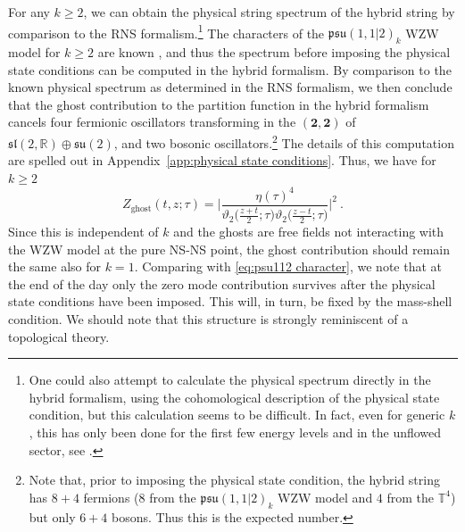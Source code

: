 \documentclass[12pt,a4paper]{article}
\newcommand{\be}{\begin{equation}}
\newcommand{\ee}{\end{equation}}
\begin{document}
For any $k \ge 2$, we can obtain the physical string spectrum of the hybrid string by comparison to the RNS formalism.\footnote{One could also attempt to calculate the physical spectrum directly in the hybrid formalism, using the cohomological description of the physical state condition, but this calculation seems to be difficult. In fact, even for generic $k$, this has only been done for the first few energy levels and in the unflowed sector, see \cite{Gerigk:2012cq}.} The characters of the $\mathfrak{psu}(1,1|2)_k$ WZW model for $k \ge 2$ are known \cite{Gotz:2006qp}, and thus the spectrum before imposing the physical state conditions can be computed in the hybrid formalism. By comparison to the known physical spectrum as determined in the RNS formalism, we then conclude that the ghost contribution to the partition function in the hybrid formalism cancels four fermionic oscillators transforming in the $(\mathbf{2},\mathbf{2})$ of $\mathfrak{sl}(2,\mathds{R}) \oplus \mathfrak{su}(2)$, and two bosonic oscillators.\footnote{Note that, prior to imposing the physical state condition, the hybrid string has $8+4$ fermions ($8$ from the $\mathfrak{psu}(1,1|2)_k$ WZW model and $4$ from the $\mathbb{T}^4$) but only $6+4$ bosons. Thus this is the expected number.}
 The details of this computation are spelled out in Appendix~\ref{app:physical state conditions}. Thus, we have for $k \ge 2$
\be 
Z_\text{ghost}(t,z;\tau)=\Bigg| \frac{\eta(\tau)^4}{\vartheta_2\big(\frac{z+t}{2};\tau\big)\vartheta_2\big(\frac{z-t}{2};\tau\big)} \Bigg|^2\ .  \label{eq:ghost partition function}
\ee
Since this is independent of $k$ and the ghosts are free fields not interacting with the WZW model at the pure NS-NS point,  the ghost contribution should remain the same also for $k=1$.
Comparing with \eqref{eq:psu112 character}, we note that at the end of the day only the zero mode contribution survives after the physical state conditions have been imposed. This will, in turn, be fixed by the mass-shell condition. We should note  that this structure is strongly reminiscent of a topological theory.
\end{document}

